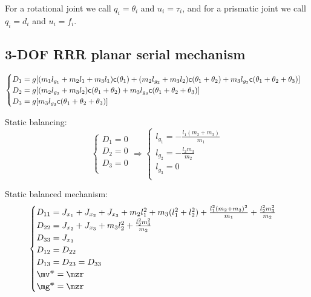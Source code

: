 \documentclass[a4paper,11pt,brazil,fleqn]{article}
\begin{document}
For a rotational joint we call $q_i = \theta_i$ and $u_i = \tau_i$, and for a prismatic joint we call $q_i = d_i$ and $u_i = f_i$.

\subsection{3-DOF RRR planar serial mechanism}\label{S03-1}

\begin{equation}
\begin{cases}
D_1 = g[ (m_1 l_{g_1} + m_2 l_1 + m_3 l_1 ) \mathsf{c}(\theta_1) + (m_2 l_{g_2} + m_3 l_2) \mathsf{c}(\theta_1 + \theta_2) + m_3 l_{g_3} \mathsf{c}(\theta_1 + \theta_2 + \theta_3) ] \\
D_2 = g[  (m_2 l_{g_2} + m_3 l_2) \mathsf{c}(\theta_1 + \theta_2) + m_3 l_{g_3} \mathsf{c}(\theta_1 + \theta_2 + \theta_3) ] \\
D_3 = g[   m_3 l_{g_3} \mathsf{c}(\theta_1 + \theta_2 + \theta_3) ] \\
\end{cases}
\end{equation} 

Static balancing:
\begin{equation}
\begin{cases}
D_1 = 0 \\
D_2 = 0 \\
D_3 = 0 \\
\end{cases}
\Rightarrow
\begin{cases}
l_{g_1} = -\frac{l_1(m_2 + m_3)}{m_1} \\
l_{g_2} = -\frac{l_2 m_3}{m_2} \\
l_{g_3} = 0 \\
\end{cases}
\end{equation}

Static balanced mechanism:
\begin{equation}
\begin{cases}
D_{11} = J_{x_1} + J_{x_2} + J_{x_3} + m_2 l_1^2 + m_3 (l_1^2 + l_2^2) + \frac{l_1^2 (m_2 + m_3)^2}{m_1} + \frac{l_2^2 m_3^2}{m_2} \\
D_{22} = J_{x_2} + J_{x_3} + m_3 l_2^2 + \frac{l_2^2 m_3^2}{m_2} \\
D_{33} = J_{x_3} \\
D_{12} = D_{22} \\
D_{13} = D_{23} = D_{33} \\
\mv\ssh = \mzr \\
\mg\ssh = \mzr
\end{cases}
\end{equation}
\end{document}
